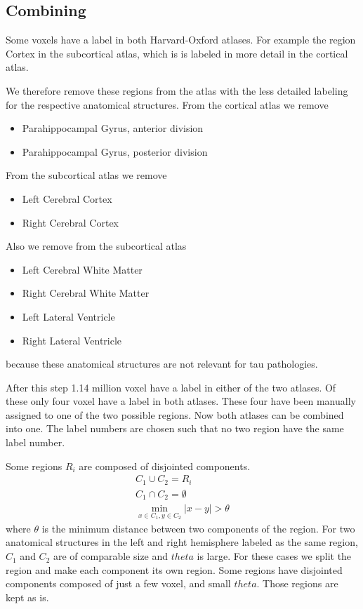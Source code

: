\documentclass[12pt, a4paper]{article}
\begin{document}
\subsection{Combining}
Some voxels have a label in both Harvard-Oxford atlases. For example the region Cortex in the subcortical atlas, which is is labeled in more detail in the cortical atlas.

We therefore remove these regions from the atlas with the less detailed labeling for the respective anatomical structures. From the cortical atlas we remove
\begin{itemize}
 \item Parahippocampal Gyrus, anterior division
 \item Parahippocampal Gyrus, posterior division
\end{itemize}
From the subcortical atlas we remove
\begin{itemize}
 \item Left Cerebral Cortex 
 \item Right Cerebral Cortex 
\end{itemize}
Also we remove from the subcortical atlas
\begin{itemize}
 \item Left Cerebral White Matter
 \item Right Cerebral White Matter
 \item Left Lateral Ventricle
 \item Right Lateral Ventricle
\end{itemize}
because these anatomical structures are not relevant for tau pathologies.

After this step 1.14 million voxel have a label in either of the two atlases.
Of these only four voxel have a label in both atlases. These four have been manually assigned to one of the two possible regions. 
Now both atlases can be combined into one. The label numbers are chosen such that no two region have the same label number.

Some regions $R_i$ are composed of disjointed components.
\begin{align}
C_1 \cup C_2 = R_i\\ 
C_1 \cap C_2 = \emptyset \\
 \min_{x \in C_1,y \in C_2} |x-y| > \theta
\end{align}
where $\theta$ is the minimum distance between two components of the region. For two anatomical structures in the left and right hemisphere labeled as the same region, $C_1$ and $C_2$ are of comparable size and $theta$ is large. For these cases we split the region and make each component its own region.
Some regions have disjointed components composed of just a few voxel, and small $theta$. Those regions are kept as is.
\end{document}
